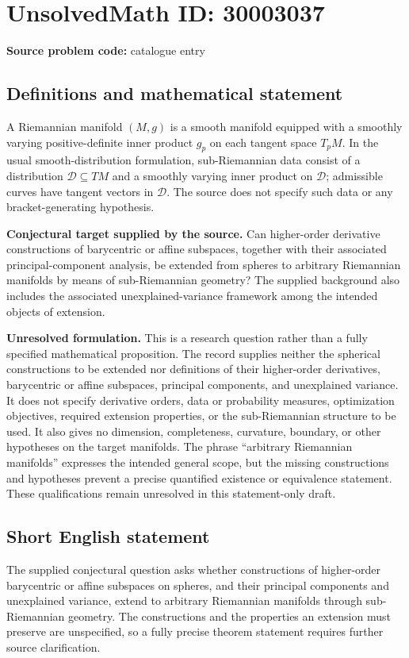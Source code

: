 \documentclass[11pt]{article}
\begin{document}
\section*{UnsolvedMath ID: 30003037}
\textbf{Source problem code:} catalogue entry
\subsection{Definitions and mathematical statement}
A Riemannian manifold \((M,g)\) is a smooth manifold equipped with a smoothly varying positive-definite inner product \(g_p\) on each tangent space \(T_pM\). In the usual smooth-distribution formulation, sub-Riemannian data consist of a distribution \(\mathcal D\subseteq TM\) and a smoothly varying inner product on \(\mathcal D\); admissible curves have tangent vectors in \(\mathcal D\). The source does not specify such data or any bracket-generating hypothesis.

\textbf{Conjectural target supplied by the source.} Can higher-order derivative constructions of barycentric or affine subspaces, together with their associated principal-component analysis, be extended from spheres to arbitrary Riemannian manifolds by means of sub-Riemannian geometry? The supplied background also includes the associated unexplained-variance framework among the intended objects of extension.

\textbf{Unresolved formulation.} This is a research question rather than a fully specified mathematical proposition. The record supplies neither the spherical constructions to be extended nor definitions of their higher-order derivatives, barycentric or affine subspaces, principal components, and unexplained variance. It does not specify derivative orders, data or probability measures, optimization objectives, required extension properties, or the sub-Riemannian structure to be used. It also gives no dimension, completeness, curvature, boundary, or other hypotheses on the target manifolds. The phrase ``arbitrary Riemannian manifolds'' expresses the intended general scope, but the missing constructions and hypotheses prevent a precise quantified existence or equivalence statement. These qualifications remain unresolved in this statement-only draft.
\subsection{Short English statement}
The supplied conjectural question asks whether constructions of higher-order barycentric or affine subspaces on spheres, and their principal components and unexplained variance, extend to arbitrary Riemannian manifolds through sub-Riemannian geometry. The constructions and the properties an extension must preserve are unspecified, so a fully precise theorem statement requires further source clarification.
\end{document}
